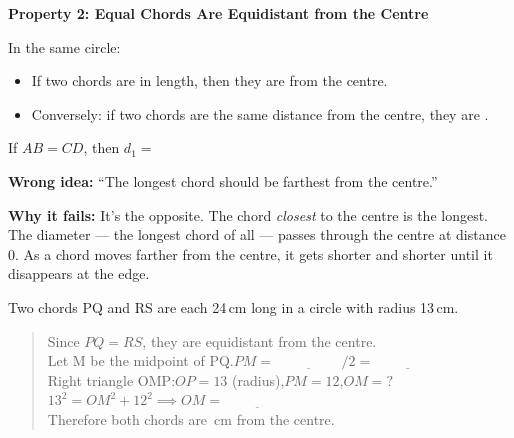 \documentclass[11pt, a4paper]{article}
\newcommand{\blank}[1]{\underline{\hspace{#1}}}
\begin{document}
\textbf{Property 2: Equal Chords Are Equidistant from the Centre}

In the same circle:
\begin{itemize}[itemsep=2pt]
  \item If two chords are \blank{3.5cm} in length, then they are \blank{3.5cm} from the centre.
  \item Conversely: if two chords are the same distance from the centre, they are \blank{3.5cm}.
\end{itemize}

\begin{center}
\end{center}

If $AB = CD$, then $d_1 =$ \blank{2cm}

\begin{tcolorbox}[misconc]
\textbf{Wrong idea:} ``The longest chord should be farthest from the centre.''

\smallskip
\textbf{Why it fails:} It's the opposite. The chord \textit{closest} to the centre is the longest. The diameter --- the longest chord of all --- passes through the centre at distance 0. As a chord moves farther from the centre, it gets shorter and shorter until it disappears at the edge.
\end{tcolorbox}

\begin{tcolorbox}[worked, title=Worked Example 2]
Two chords PQ and RS are each 24\,cm long in a circle with radius 13\,cm.
\begin{quote}
Since $PQ = RS$, they are equidistant from the centre.\\[4pt]
Let M be the midpoint of PQ.\quad $PM = \blank{2cm}/2 = \blank{2cm}$\\[4pt]
Right triangle OMP:\quad $OP = 13$ (radius),\quad $PM = 12$,\quad $OM = ?$\\[4pt]
$13^2 = OM^2 + 12^2 \implies OM = \blank{2cm}$\\[4pt]
Therefore both chords are \blank{2cm}\,cm from the centre.
\end{quote}
\end{tcolorbox}
\end{document}
